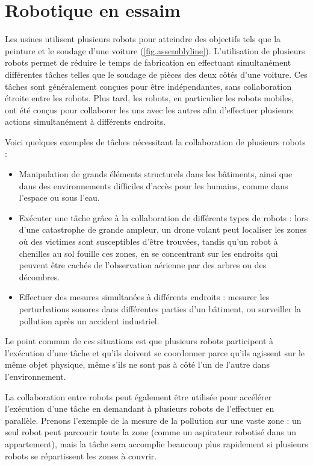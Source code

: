 
\chapter{Robotique en essaim}\label{ch.swarm}

Les usines utilisent plusieurs robots pour atteindre des objectifs tels que la peinture et le soudage d'une voiture (\ref{fig.assemblyline}). L'utilisation de plusieurs robots permet de réduire le temps de fabrication en effectuant simultanément différentes tâches telles que le soudage de pièces des deux côtés d'une voiture. Ces tâches sont généralement conçues pour être indépendantes, sans collaboration étroite entre les robots. Plus tard, les robots, en particulier les robots mobiles, ont été conçus pour collaborer les uns avec les autres afin d'effectuer plusieurs actions simultanément à différents endroits.

Voici quelques exemples de tâches nécessitant la collaboration de plusieurs robots :
\begin{itemize}
\item Manipulation de grands éléments structurels dans les bâtiments, ainsi que dans des environnements difficiles d'accès pour les humains, comme dans l'espace ou sous l'eau.
\item Exécuter une tâche grâce à la collaboration de différents types de robots : lors d'une catastrophe de grande ampleur, un drone volant peut localiser les zones où des victimes sont susceptibles d'être trouvées, tandis qu'un robot à chenilles au sol fouille ces zones, en se concentrant sur les endroits qui peuvent être cachés de l'observation aérienne par des arbres ou des décombres.
\item Effectuer des mesures simultanées à différents endroits : mesurer les perturbations sonores dans différentes parties d'un bâtiment, ou surveiller la pollution après un accident industriel. 
\end{itemize}
Le point commun de ces situations est que plusieurs robots participent à l'exécution d'une tâche et qu'ils doivent se coordonner parce qu'ils agissent sur le même objet physique, même s'ils ne sont pas à côté l'un de l'autre dans l'environnement. 

La collaboration entre robots peut également être utilisée pour accélérer l'exécution d'une tâche en demandant à plusieurs robots de l'effectuer en parallèle. Prenons l'exemple de la mesure de la pollution sur une vaste zone : un seul robot peut parcourir toute la zone (comme un aspirateur robotisé dans un appartement), mais la tâche sera accomplie beaucoup plus rapidement si plusieurs robots se répartissent les zones à couvrir.

